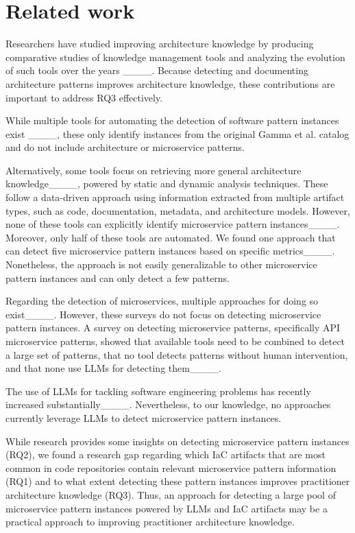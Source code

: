 \section{Related work}
\label{related-work}

Researchers have studied improving architecture knowledge by producing comparative studies of knowledge management tools and analyzing the evolution of such tools over the years ____. Because detecting and documenting architecture patterns improves architecture knowledge, these contributions are important to address RQ3 effectively.

While multiple tools for automating the detection of software pattern instances exist
____, these only identify instances from the original Gamma et al. catalog and do not include architecture or microservice patterns.

Alternatively, some tools focus on retrieving more general architecture knowledge____, powered by static and dynamic analysis techniques. These follow a data-driven approach using information extracted from multiple artifact types, such as code, documentation, metadata, and architecture models. However, none of these tools can explicitly identify microservice pattern instances____. Moreover, only half of these tools are automated. We found one approach that can detect five microservice pattern instances based on specific metrics____. Nonetheless, the approach is not easily generalizable to other microservice pattern instances and can only detect a few patterns. 

Regarding the detection of microservices, multiple approaches for doing so exist____. However, these surveys do not focus on detecting microservice pattern instances. A survey on detecting microservice patterns, specifically API microservice patterns, showed that available tools need to be combined to detect a large set of patterns, that no tool detects patterns without human intervention, and that none use LLMs for detecting them____.

The use of LLMs for tackling software engineering problems has recently increased substantially____. Nevertheless, to our knowledge, no approaches currently leverage LLMs to detect microservice pattern instances.

While research provides some insights on detecting microservice pattern instances (RQ2), we found a research gap regarding which IaC artifacts that are most common in code repositories contain relevant microservice pattern information (RQ1) and to what extent detecting these pattern instances improves practitioner architecture knowledge (RQ3). Thus, an approach for detecting a large pool of microservice pattern instances powered by LLMs and IaC artifacts may be a practical approach to improving practitioner architecture knowledge.

